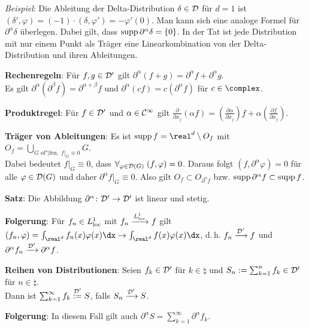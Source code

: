 \emph{Beispiel}:
Die Ableitung der Delta-Distribution $\delta \in \mathcal{D}$ für $d = 1$ ist\\
$(\delta', \varphi) = (-1) \cdot (\delta, \varphi') = -\varphi'(0)$.
Man kann sich eine analoge Formel für $\partial^\alpha \delta$ überlegen.
Dabei gilt, dass $\operatorname{supp} \partial^\alpha \delta = \{0\}$.
In der Tat ist jede Distribution mit nur einem Punkt als Träger eine
Linearkombination von der Delta-Distribution und ihren Ableitungen.

\linie

\textbf{Rechenregeln}:
Für $f, g \in \mathcal{D}'$ gilt
$\partial^\alpha (f + g) = \partial^\alpha f + \partial^\alpha g$.\\
Es gilt $\partial^\alpha (\partial^\beta f) = \partial^{\alpha + \beta} f$ und
$\partial^\alpha (cf) = c (\partial^\alpha f)$ für $c \in \complex$.

\textbf{Produktregel}:
Für $f \in \mathcal{D}'$ und $\alpha \in \mathcal{C}^\infty$ gilt
$\frac{\partial}{\partial x_j} (\alpha f) =
\left(\frac{\partial \alpha}{\partial x_j}\right) f +
\alpha \left(\frac{\partial f}{\partial x_j}\right)$.

\textbf{Träger von Ableitungen}:
Es ist $\supp f = \real^d \setminus O_f$ mit
$O_f = \bigcup_{G \text{ of"|fen},\; f|_G \equiv 0} G$.\\
Dabei bedeutet $f|_G \equiv 0$, dass
$\forall_{\varphi \in \mathcal{D}(G)}\; (f, \varphi) = 0$.
Daraus folgt $(f, \partial^\alpha \varphi) = 0$ für alle $\varphi \in \mathcal{D}(G)$
und daher $\partial^\alpha f|_G \equiv 0$.
Also gilt $O_f \subset O_{\partial^\alpha f}$ bzw.
$\operatorname{supp} \partial^\alpha f \subset \operatorname{supp} f$.

\textbf{Satz}:
Die Abbildung $\partial^\alpha\colon \mathcal{D}' \rightarrow \mathcal{D}'$
ist linear und stetig.

\textbf{Folgerung}:
Für $f_n \in L^1_{{\operatorname{loc}}}$ mit $f_n \xrightarrow{L^1_{{\operatorname{loc}}}} f$ gilt
$(f_n, \varphi) = \int_{\real^d} f_n(x) \varphi(x) \dx \to
\int_{\real^d} f(x) \varphi(x) \dx$, d.\,h.
$f_n \xrightarrow{\mathcal{D}'} f$ und
$\partial^\alpha f_n \xrightarrow{\mathcal{D}'} \partial^\alpha f$.

\linie

\textbf{Reihen von Distributionen}:
Seien $f_k \in \mathcal{D}'$ für $k \in \natural$ und
$S_n := \sum_{k=1}^n f_k \in \mathcal{D}'$ für $n \in \natural$.\\
Dann ist $\sum_{k=1}^\infty f_k \overset{\mathcal{D}'}{:=} S$, falls
$S_n \xrightarrow{\mathcal{D}'} S$.

\textbf{Folgerung}:
In diesem Fall gilt auch
$\partial^\alpha S = \sum_{k=1}^\infty \partial^\alpha f_k$.

